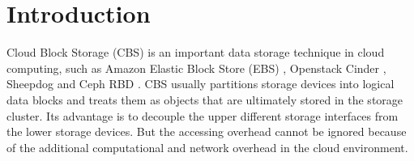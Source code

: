 \documentclass[sigconf, nonacm]{acmart}
\newcommand\vldbdoi{XX.XX/XXX.XX}
\newcommand\vldbpages{XXX-XXX}
\newcommand\vldbvolume{14}
\newcommand\vldbissue{1}
\newcommand\vldbyear{2020}
\newcommand\vldbauthors{\authors}
\newcommand\vldbtitle{\shorttitle}
\newcommand\vldbavailabilityurl{URL_TO_YOUR_ARTIFACTS}
\newcommand\vldbpagestyle{plain}
\begin{document}
%

\section{Introduction}
Cloud Block Storage (CBS) is an important data storage technique in cloud computing, such as Amazon Elastic Block Store (EBS) \cite{varia2014overview}, Openstack Cinder \cite{shrivastwa2016openstack}, Sheepdog \cite{morita2010sheepdog} and Ceph RBD \cite{weil2006ceph,weil2007rados}. CBS usually partitions storage devices into logical data blocks and treats them as objects that are ultimately stored in the storage cluster. Its advantage is to decouple the upper different storage interfaces from the lower storage devices. But the accessing overhead cannot be ignored because of the additional computational and network overhead in the cloud environment.
\end{document}
